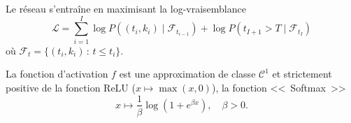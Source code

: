 \documentclass[../main.tex]{subfiles}
\begin{document}

Le réseau s'entraîne en maximisant la log-vraisemblance
\begin{equation}\label{eq:likelihood}
	\mathcal{L} = \sum_{i=1}^{I} \log P((t_i,k_i)\mid \mathcal{F}_{t_{i-1}})
	+ \log P(t_{I+1}>T\mid \mathcal{F}_{t_{I}})
\end{equation}
où $\mathcal{F}_t = \{ (t_i,k_i)\,:\, t \leq t_i \}$.

La fonction d'activation $f$ est une approximation de classe $\mathcal C^1$ et strictement positive de la fonction ReLU ($x\mapsto \max(x,0)$), la fonction <<~Softmax~>>
\[
x\mapsto \frac{1}{\beta}\log(1+e^{\beta x}),\quad\beta > 0.
\]
\end{document}
